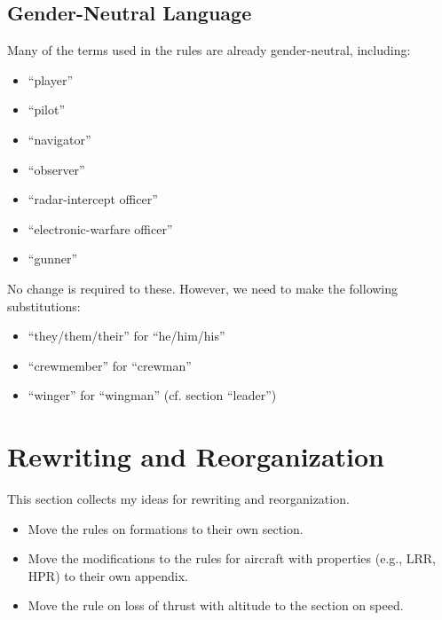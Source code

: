 \documentclass[10pt]{article}
\begin{document}
\subsection*{Gender-Neutral Language}
 
Many of the terms used in the rules are already gender-neutral, including:
\begin{itemize}
    \item “player”
    \item “pilot”
    \item “navigator”
    \item “observer”
    \item “radar-intercept officer”
    \item “electronic-warfare officer”
    \item “gunner”
\end{itemize}
No change is required to these. However, we need to make the following substitutions: 
\begin{itemize}
    \item “they/them/their” for “he/him/his”
    \item “crewmember” for “crewman”
    \item “winger” for “wingman” (cf. section “leader”)
\end{itemize}

\section*{Rewriting and Reorganization}

This section collects my ideas for rewriting and reorganization.

\begin{itemize}
    \item Move the rules on formations to their own section.
    \item Move the modifications to the rules for aircraft with properties (e.g., LRR, HPR) to their own appendix.
    \item Move the rule on loss of thrust with altitude to the section on speed.
\end{itemize}
\end{document}
